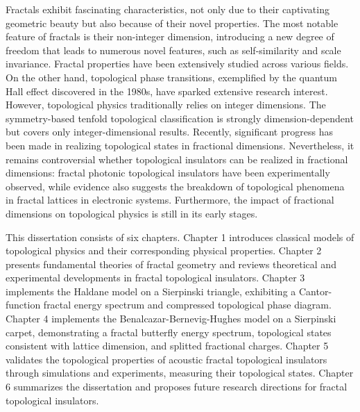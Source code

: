 \cleardoublepage
{}
Fractals exhibit fascinating characteristics, not only due to their captivating geometric beauty but also because of their novel properties. The most notable feature of fractals is their non-integer dimension, introducing a new degree of freedom that leads to numerous novel features, such as self-similarity and scale invariance. Fractal properties have been extensively studied across various fields. On the other hand, topological phase transitions, exemplified by the quantum Hall effect discovered in the 1980s, have sparked extensive research interest. However, topological physics traditionally relies on integer dimensions. The symmetry-based tenfold topological classification is strongly dimension-dependent but covers only integer-dimensional results. Recently, significant progress has been made in realizing topological states in fractional dimensions. Nevertheless, it remains controversial whether topological insulators can be realized in fractional dimensions: fractal photonic topological insulators have been experimentally observed, while evidence also suggests the breakdown of topological phenomena in fractal lattices in electronic systems. Furthermore, the impact of fractional dimensions on topological physics is still in its early stages.

This dissertation consists of six chapters. Chapter 1 introduces classical models of topological physics and their corresponding physical properties. Chapter 2 presents fundamental theories of fractal geometry and reviews theoretical and experimental developments in fractal topological insulators. Chapter 3 implements the Haldane model on a Sierpinski triangle, exhibiting a Cantor-function fractal energy spectrum and compressed topological phase diagram. Chapter 4 implements the Benalcazar-Bernevig-Hughes model on a Sierpinski carpet, demonstrating a fractal butterfly energy spectrum, topological states consistent with lattice dimension, and splitted fractional charges. Chapter 5 validates the topological properties of acoustic fractal topological insulators through simulations and experiments, measuring their topological states. Chapter 6 summarizes the dissertation and proposes future research directions for fractal topological insulators.


